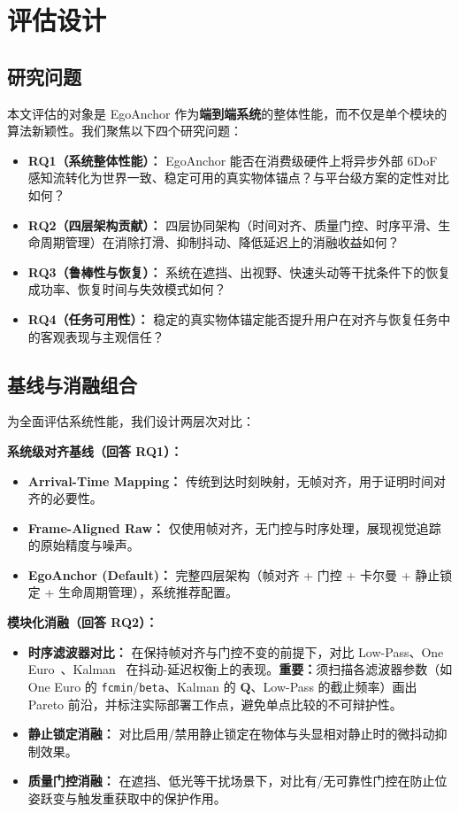 \documentclass[review]{vgtc}
\begin{document}
\section{评估设计}

\subsection{研究问题}

本文评估的对象是 EgoAnchor 作为\textbf{端到端系统}的整体性能，而不仅是单个模块的算法新颖性。我们聚焦以下四个研究问题：

\begin{itemize}[leftmargin=1.4em]
  \item \textbf{RQ1（系统整体性能）：} EgoAnchor 能否在消费级硬件上将异步外部 6DoF 感知流转化为世界一致、稳定可用的真实物体锚点？与平台级方案的定性对比如何？
  \item \textbf{RQ2（四层架构贡献）：} 四层协同架构（时间对齐、质量门控、时序平滑、生命周期管理）在消除打滑、抑制抖动、降低延迟上的消融收益如何？
  \item \textbf{RQ3（鲁棒性与恢复）：} 系统在遮挡、出视野、快速头动等干扰条件下的恢复成功率、恢复时间与失效模式如何？
  \item \textbf{RQ4（任务可用性）：} 稳定的真实物体锚定能否提升用户在对齐与恢复任务中的客观表现与主观信任？
\end{itemize}

\subsection{基线与消融组合}

为全面评估系统性能，我们设计两层次对比：

\noindent\textbf{系统级对齐基线（回答 RQ1）：}
\begin{itemize}[leftmargin=1.4em]
  \item \textbf{Arrival-Time Mapping：} 传统到达时刻映射，无帧对齐，用于证明时间对齐的必要性。
  \item \textbf{Frame-Aligned Raw：} 仅使用帧对齐，无门控与时序处理，展现视觉追踪的原始精度与噪声。
  \item \textbf{EgoAnchor (Default)：} 完整四层架构（帧对齐 + 门控 + 卡尔曼 + 静止锁定 + 生命周期管理），系统推荐配置。
\end{itemize}

\noindent\textbf{模块化消融（回答 RQ2）：}
\begin{itemize}[leftmargin=1.4em]
  \item \textbf{时序滤波器对比：} 在保持帧对齐与门控不变的前提下，对比 Low-Pass、One Euro~\cite{casiez2012oneeuro}、Kalman~\cite{kalman1960new} 在抖动-延迟权衡上的表现。\textbf{重要：}须扫描各滤波器参数（如 One Euro 的 \texttt{fcmin}/\texttt{beta}、Kalman 的 $\mathbf{Q}$、Low-Pass 的截止频率）画出 Pareto 前沿，并标注实际部署工作点，避免单点比较的不可辩护性。
  \item \textbf{静止锁定消融：} 对比启用/禁用静止锁定在物体与头显相对静止时的微抖动抑制效果。
  \item \textbf{质量门控消融：} 在遮挡、低光等干扰场景下，对比有/无可靠性门控在防止位姿跃变与触发重获取中的保护作用。
\end{itemize}
\end{document}
